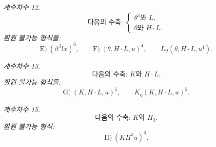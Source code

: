 
\noindent\emph{계수차수 12.}
\[
\text{다음의 수축: }\left\{\begin{array}{l}
\theta^3\text{와 }L,\\
\theta\text{와 }H\cdot L.
\end{array}\right.
\]
\noindent\emph{환원 불가능 형식들:}
\[
\text{E)}\ (\vartheta^3lx)^6,
\qquad
\text{F)}\ (\theta,H\cdot L,u)^4,
\qquad L_\vartheta(\theta,H\cdot L,u^4).
\]

\noindent\emph{계수차수 13.}
\[
\text{다음의 수축: }K\text{와 }H\cdot L.
\]
\noindent\emph{환원 불가능 형식들:}
\[
\text{G)}\ (K,H\cdot L,u)^5,
\qquad K_\eta(K,H\cdot L,u)^5.
\]

\noindent\emph{계수차수 15.}
\[
\text{다음의 수축: }K\text{와 }H_3.
\]
\noindent\emph{환원 불가능 형식:}
\[
\text{H)}\ (KH^3u)^6.
\]
